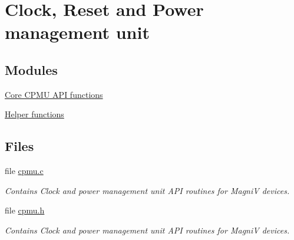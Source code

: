 \hypertarget{group___c_p_m_u}{}\section{Clock, Reset and Power management unit}
\label{group___c_p_m_u}
\subsection*{Modules}
\begin{DoxyCompactItemize}
\item 
\hyperlink{group___core_c_p_m_u}{Core C\+P\+M\+U A\+P\+I functions}
\item 
\hyperlink{group__helper_c_p_m_u}{Helper functions}
\end{DoxyCompactItemize}
\subsection*{Files}
\begin{DoxyCompactItemize}
\item 
file \hyperlink{cpmu_8c}{cpmu.\+c}
\begin{DoxyCompactList}\small\item\em Contains Clock and power management unit A\+P\+I routines for Magni\+V devices. \end{DoxyCompactList}\item 
file \hyperlink{cpmu_8h}{cpmu.\+h}
\begin{DoxyCompactList}\small\item\em Contains Clock and power management unit A\+P\+I routines for Magni\+V devices. \end{DoxyCompactList}\end{DoxyCompactItemize}
